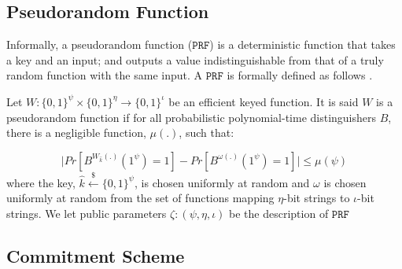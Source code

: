 \subsection{Pseudorandom Function}

Informally, a pseudorandom function ($\mathtt{PRF}$) is a deterministic function that takes a key and an input; and outputs a value  indistinguishable from that of  a truly random function with the same input.   A $\mathtt{PRF}$ is formally defined as follows \cite{DBLP:books/crc/KatzLindell2007}. 
\begin{definition} Let $W:\{0,1\}^{\scriptscriptstyle\psi}\times \{0,1\}^{\scriptscriptstyle \eta}\rightarrow \{0,1\}^{\scriptscriptstyle  \iota}$ be an efficient  keyed function. It is said $W$ is a pseudorandom function if for all probabilistic polynomial-time distinguishers $B$, there is a negligible function, $\mu(.)$, such that:

\begin{equation*}
\bigg | Pr[B^{\scriptscriptstyle W_{\hat{k}}(.)}(1^{\scriptscriptstyle \psi})=1]- Pr[B^{\scriptscriptstyle \omega(.)}(1^{\scriptscriptstyle \psi})=1] \bigg |\leq \mu(\psi)
\end{equation*}
where  the key, $\hat{k}\stackrel{\scriptscriptstyle\$}\leftarrow\{0,1\}^{\scriptscriptstyle\psi}$, is chosen uniformly at random and $\omega$ is chosen uniformly at random from the set of functions mapping $\eta$-bit strings to $\iota$-bit strings. We let public parameters $\zeta:(\psi,\eta, \iota)$ be the description of $\mathtt{PRF}$
\end{definition}


\subsection{Commitment Scheme}


